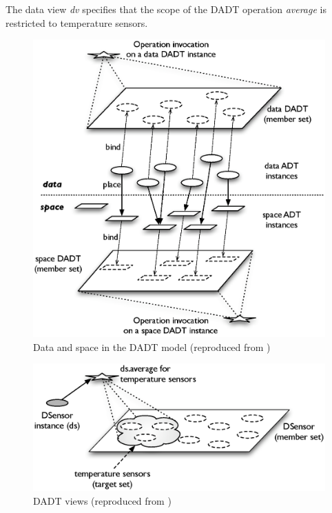 The data view \emph{dv} specifies that the scope of the DADT operation
\emph{average} is restricted to temperature sensors.

\begin{figure}
\centering
\includegraphics[scale=0.65]{img/DADTs.eps} 
\caption[Data and space in the DADT model]{Data and space in the DADT model (reproduced from 
\cite{migliavacca_DADT:2006})}
\label{Fig:DADTs}
\end{figure}

\begin{figure}
\centering
\includegraphics[width=\textwidth]{img/DADT_Views.eps} 
\caption[DADT views]{DADT views (reproduced from \cite{migliavacca_DADT:2006})}
\label{Fig:DADT_Views}
\end{figure}

